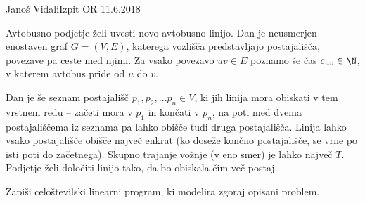 \begin{naloga}{Janoš Vidali}{Izpit OR 11.6.2018}
\begin{vprasanje}
Avtobusno podjetje želi uvesti novo avtobusno linijo.
Dan je neusmerjen enostaven graf $G = (V, E)$,
katerega vozlišča predstavljajo postajališča,
povezave pa ceste med njimi.
Za vsako povezavo $uv \in E$ poznamo še čas $c_{uv} \in \N$,
v katerem avtobus pride od $u$ do $v$.

Dan je še seznam postajališč $p_1, p_2, \dots p_n \in V$,
ki jih linija mora obiskati v tem vrstnem redu
-- začeti mora v $p_1$ in končati v $p_n$,
na poti med dvema postajališčema iz seznama
pa lahko obišče tudi druga postajališča.
Linija lahko vsako postajališče obišče največ enkrat
(ko doseže končno postajališče, se vrne po isti poti do začetnega).
Skupno trajanje vožnje (v eno smer) je lahko največ $T$.
Podjetje želi določiti linijo tako, da bo obiskala čim več postaj.

Zapiši celoštevilski linearni program, ki modelira zgoraj opisani problem.
\end{vprasanje}


\end{naloga}
